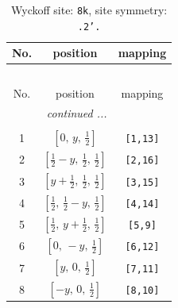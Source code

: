 \documentclass[fleqn,8pt]{jsarticle}
\begin{document}
\begin{longtable}{ccc}
\caption{Wyckoff site: {\tt 8k}, site symmetry: {\tt .2'.}}
 \\
 \hline \hline
No. & position & mapping \\ \hline \endfirsthead

\multicolumn{2}{l}{\tablename\ \thetable{}} \\
 \hline \hline
No. & position & mapping \\ \hline \endhead

 \hline \hline
\multicolumn{2}{r}{\footnotesize\it continued ...} \\ \endfoot

 \hline \hline
\multicolumn{2}{r}{} \\ \endlastfoot

1 & $\left[ 0,\, y,\, \frac{1}{2} \right]$ & {\tt [1,13]} \\ \hline
2 & $\left[ \frac{1}{2} - y,\, \frac{1}{2},\, \frac{1}{2} \right]$ & {\tt [2,16]} \\ \hline
3 & $\left[ y + \frac{1}{2},\, \frac{1}{2},\, \frac{1}{2} \right]$ & {\tt [3,15]} \\ \hline
4 & $\left[ \frac{1}{2},\, \frac{1}{2} - y,\, \frac{1}{2} \right]$ & {\tt [4,14]} \\ \hline
5 & $\left[ \frac{1}{2},\, y + \frac{1}{2},\, \frac{1}{2} \right]$ & {\tt [5,9]} \\ \hline
6 & $\left[ 0,\, - y,\, \frac{1}{2} \right]$ & {\tt [6,12]} \\ \hline
7 & $\left[ y,\, 0,\, \frac{1}{2} \right]$ & {\tt [7,11]} \\ \hline
8 & $\left[ - y,\, 0,\, \frac{1}{2} \right]$ & {\tt [8,10]} \\
\end{longtable}
\renewcommand{\arraystretch}{1.2}
\end{document}
